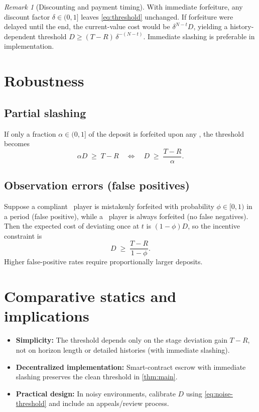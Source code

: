 \documentclass[a4paper,11pt]{article}
\theoremstyle{definition}
\theoremstyle{plain}
\theoremstyle{remark}
\newtheorem*{remark}{Remark}
\newcommand{\C}{\text{C}} %
\newcommand{\D}{\text{D}} %
\newcommand{\1}{\mathbf{1}}
\begin{document}
\begin{remark}[Discounting and payment timing]
With immediate forfeiture, any discount factor $\delta\in(0,1]$ leaves \eqref{eq:threshold} unchanged. If forfeiture were delayed until the end, the current-value cost would be $\delta^{N-t}D$, yielding a history-dependent threshold $D \ge (T-R)\,\delta^{-(N-t)}$. Immediate slashing is preferable in implementation.
\end{remark}

\section{Robustness}
\subsection{Partial slashing}
If only a fraction $\alpha\in(0,1]$ of the deposit is forfeited upon any \D, the threshold becomes
\[
\alpha D \;\ge\; T-R
\quad\iff\quad
D \;\ge\; \frac{T-R}{\alpha}.
\]

\subsection{Observation errors (false positives)}
Suppose a compliant \C\ player is mistakenly forfeited with probability $\phi\in[0,1)$ in a period (false positive), while a \D\ player is always forfeited (no false negatives).
Then the expected cost of deviating once at $t$ is $(1-\phi)D$, so the incentive constraint is
\begin{equation}\label{eq:noise-threshold}
D \;\ge\; \frac{T-R}{1-\phi}.
\end{equation}
Higher false-positive rates require proportionally larger deposits.

\section{Comparative statics and implications}
\begin{itemize}[leftmargin=1.5em]
  \item \textbf{Simplicity:} The threshold depends only on the stage deviation gain $T-R$, not on horizon length or detailed histories (with immediate slashing).
  \item \textbf{Decentralized implementation:} Smart-contract escrow with immediate slashing preserves the clean threshold in \cref{thm:main}.
  \item \textbf{Practical design:} In noisy environments, calibrate $D$ using \eqref{eq:noise-threshold} and include an appeals/review process.
\end{itemize}
\end{document}
